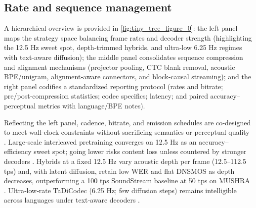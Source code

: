 \subsection{Rate and sequence management} \label{subsec:Rate and sequence management}
A hierarchical overview is provided in \autoref{fig:tiny_tree_figure_0}: the left panel maps the strategy space balancing frame rates and decoder strength (highlighting the 12.5 Hz sweet spot, depth‑trimmed hybrids, and ultra‑low 6.25 Hz regimes with text‑aware diffusion); the middle panel consolidates sequence compression and alignment mechanisms (projector pooling, CTC blank removal, acoustic BPE/unigram, alignment‑aware connectors, and block‑causal streaming); and the right panel codifies a standardized reporting protocol (rates and bitrate; pre/post‑compression statistics; codec specifics; latency; and paired accuracy–perceptual metrics with language/BPE notes).

Reflecting the left panel, cadence, bitrate, and emission schedules are co‑designed to meet wall‑clock constraints without sacrificing semantics or perceptual quality \cite{zhao2024textlessstreamingspeechtranslationsemant,liu2024analyzingmitigatinginconsistencydiscrete,zhang2025impactframeratesspeechtokenizercasestudy,huang2024repcodecspeechrepresentationcodectokeniz}. Large‑scale interleaved pretraining converges on 12.5 Hz as an accuracy–efficiency sweet spot; going lower risks content loss unless countered by stronger decoders \cite{zeng2024scalingspeechtextpretrainingsyntheticint}. Hybrids at a fixed 12.5 Hz vary acoustic depth per frame (12.5–112.5 tps) and, with latent diffusion, retain low WER and flat DNSMOS as depth decreases, outperforming a 100 tps SoundStream baseline at 50 tps on MUSHRA \cite{yang2025diffsoundstreamefficientspeechtokenizati}. Ultra‑low‑rate TaDiCodec (6.25 Hz; few diffusion steps) remains intelligible across languages under text‑aware decoders \cite{wang2025tadicodectextawarediffusionspeechtokeniz}.

